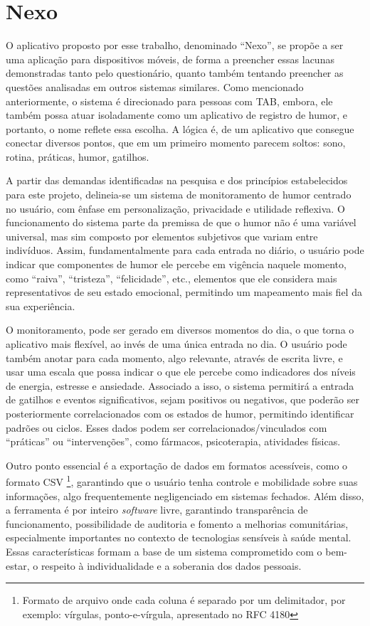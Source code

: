 \chapter{Nexo}

O aplicativo proposto por esse trabalho, denominado ``Nexo'', se propõe a ser uma
aplicação para dispositivos móveis, de forma a preencher essas lacunas
demonstradas tanto pelo questionário, quanto também tentando preencher as
questões analisadas em outros sistemas similares. Como mencionado
anteriormente, o sistema é direcionado para pessoas com TAB, embora, ele também
possa atuar isoladamente como um aplicativo de registro de humor, e portanto, o
nome reflete essa escolha. A lógica é, de um aplicativo que consegue conectar
diversos pontos, que em um primeiro momento parecem soltos: sono, rotina,
práticas, humor, gatilhos.

A partir das demandas identificadas na pesquisa e dos princípios estabelecidos
para este projeto, delineia-se um sistema de monitoramento de humor centrado no
usuário, com ênfase em personalização, privacidade e utilidade reflexiva. O
funcionamento do sistema parte da premissa de que o humor não é uma variável
universal, mas sim composto por elementos subjetivos que variam entre
indivíduos. Assim, fundamentalmente para cada entrada no diário, o usuário pode
indicar que componentes de humor ele percebe em vigência naquele momento, como
``raiva'', ``tristeza'', ``felicidade'', etc., elementos que ele considera mais
representativos de seu estado emocional, permitindo um mapeamento mais fiel da
sua experiência.

O monitoramento, pode ser gerado em diversos momentos do dia, o que torna o
aplicativo mais flexível, ao invés de uma única entrada no dia. O usuário pode
também anotar para cada momento, algo relevante, através de escrita livre, e
usar uma escala que possa indicar o que ele percebe como indicadores dos níveis
de energia, estresse e ansiedade. Associado a isso, o sistema permitirá a
entrada de gatilhos e eventos significativos, sejam positivos ou negativos, que
poderão ser posteriormente correlacionados com os estados de humor, permitindo
identificar padrões ou ciclos. Esses dados podem ser correlacionados/vinculados
com ``práticas'' ou ``intervenções'', como fármacos, psicoterapia, atividades
físicas.

Outro ponto essencial é a exportação de dados em formatos acessíveis, como o
formato CSV \cite{Shafranovich_2005} \footnote{Formato de arquivo onde cada
coluna é separado por um delimitador, por exemplo: vírgulas, ponto-e-vírgula,
apresentado no RFC 4180}, garantindo que o usuário tenha controle e mobilidade
sobre suas informações, algo frequentemente negligenciado em sistemas fechados.
Além disso, a ferramenta é por inteiro \textit{software} livre, garantindo
transparência de funcionamento, possibilidade de auditoria e fomento a
melhorias comunitárias, especialmente importantes no contexto de tecnologias
sensíveis à saúde mental. Essas características formam a base de um sistema
comprometido com o bem-estar, o respeito à individualidade e a soberania dos
dados pessoais.

